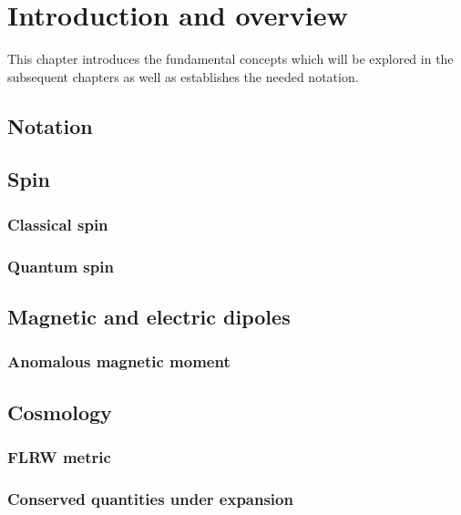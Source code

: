 \chapter{Introduction and overview}
\noindent This chapter introduces the fundamental concepts which will be explored in the subsequent chapters as well as establishes the needed notation.

\section{Notation}
\section{Spin}
\subsection{Classical spin}
\subsection{Quantum spin}
\section{Magnetic and electric dipoles}
\subsection{Anomalous magnetic moment}
\section{Cosmology}
\subsection{FLRW metric}
\subsection{Conserved quantities under expansion}